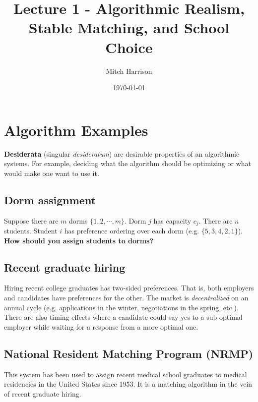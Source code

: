 \documentclass[titlepage, 12pt, leqno]{article}
\title{\Huge{Lecture 1 - Algorithmic Realism, Stable Matching, and School Choice}}
\author{\large{Mitch Harrison}}
\date{\today}
\begin{document}
\setlength{\parskip}{1\baselineskip}
\setlength{\parindent}{15pt}
\maketitle
\tableofcontents
\newpage


\section{Algorithm Examples}

\begin{definition}
    \textbf{Desiderata} (singular \textit{desideratum}) are desirable properties
    of an algorithmic systems. For example, deciding what the algorithm should be
    optimizing or what would make one want to use it.
\end{definition}

\subsection{Dorm assignment}
Suppose there are $m$ dorms $\{1,2, \cdots ,m\}$. Dorm $j$ has capacity 
$c_j$. There are $n$ students. Student $i$ has preference ordering over each 
dorm (e.g. $\{5, 3, 4, 2, 1\}$). \textbf{How should you assign students to 
dorms?}

\subsection{Recent graduate hiring}
Hiring recent college graduates has two-sided preferences. That is, both
employers and candidates have preferences for the other. The market is
\textit{decentralized} on an annual cycle (e.g. applications in the winter,
negotiations in the spring, etc.). There are also timing effects where a
candidate could say yes to a sub-optimal employer while waiting for a response
from a more optimal one.

\subsection{National Resident Matching Program (NRMP)}
This system has been used to assign recent medical school graduates to medical
residencies in the United States since 1953. It is a matching algorithm in the
vein of recent graduate hiring.
\end{document}
